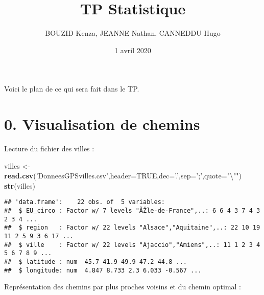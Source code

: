 \documentclass[
]{article}
\title{TP Statistique}
\author{BOUZID Kenza, JEANNE Nathan, CANNEDDU Hugo}
\date{1 avril 2020}
\newenvironment{Shaded}{\begin{snugshade}}{\end{snugshade}}
\newcommand{\CharTok}[1]{\textcolor[rgb]{0.31,0.60,0.02}{#1}}
\newcommand{\DataTypeTok}[1]{\textcolor[rgb]{0.13,0.29,0.53}{#1}}
\newcommand{\KeywordTok}[1]{\textcolor[rgb]{0.13,0.29,0.53}{\textbf{#1}}}
\newcommand{\NormalTok}[1]{#1}
\newcommand{\OtherTok}[1]{\textcolor[rgb]{0.56,0.35,0.01}{#1}}
\newcommand{\StringTok}[1]{\textcolor[rgb]{0.31,0.60,0.02}{#1}}
\begin{document}
\maketitle

Voici le plan de ce qui sera fait dans le TP.

\hypertarget{visualisation-de-chemins}{%
\section{0. Visualisation de chemins}\label{visualisation-de-chemins}}

Lecture du fichier des villes :

\begin{Shaded}
\begin{Highlighting}[]
\NormalTok{villes <-}\StringTok{ }\KeywordTok{read.csv}\NormalTok{(}\StringTok{'DonneesGPSvilles.csv'}\NormalTok{,}\DataTypeTok{header=}\OtherTok{TRUE}\NormalTok{,}\DataTypeTok{dec=}\StringTok{'.'}\NormalTok{,}\DataTypeTok{sep=}\StringTok{';'}\NormalTok{,}\DataTypeTok{quote=}\StringTok{"}\CharTok{\textbackslash{}"}\StringTok{"}\NormalTok{)}
\KeywordTok{str}\NormalTok{(villes)}
\end{Highlighting}
\end{Shaded}

\begin{verbatim}
## 'data.frame':    22 obs. of  5 variables:
##  $ EU_circo : Factor w/ 7 levels "ÃŽle-de-France",..: 6 6 4 3 7 4 3 2 3 4 ...
##  $ region   : Factor w/ 22 levels "Alsace","Aquitaine",..: 22 10 19 11 2 5 9 3 6 17 ...
##  $ ville    : Factor w/ 22 levels "Ajaccio","Amiens",..: 11 1 2 3 4 5 6 7 8 9 ...
##  $ latitude : num  45.7 41.9 49.9 47.2 44.8 ...
##  $ longitude: num  4.847 8.733 2.3 6.033 -0.567 ...
\end{verbatim}

Représentation des chemins par plus proches voisins et du chemin optimal
:
\end{document}
